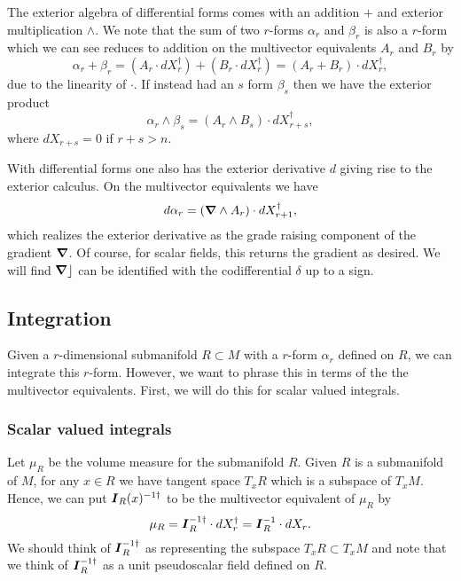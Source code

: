 The exterior algebra of differential forms comes with an addition $+$ and exterior multiplication $\wedge$.  We note that the sum of two $r$-forms $\alpha_r$ and $\beta_r$ is also a $r$-form which we can see reduces to addition on the multivector equivalents $A_r$ and $B_r$ by
\begin{equation}
\alpha_r + \beta_r = (A_r \cdot dX_r^\dagger)+(B_r \cdot dX_r^\dagger) = (A_r + B_r) \cdot dX_r^\dagger,
\end{equation}
due to the linearity of $\cdot$.  If instead had an $s$ form $\beta_s$ then we have the exterior product
\begin{equation}
\alpha_r \wedge \beta_s = (A_r \wedge B_s) \cdot dX_{r+s}^\dagger,
\end{equation}
where $dX_{r+s}=0$ if $r+s>n$.  

With differential forms one also has the exterior derivative $d$ giving rise to the exterior calculus. On the multivector equivalents we have
\begin{equation}
d \alpha_r = (\boldsymbol{\nabla} \wedge A_r) \cdot dX_{r+1}^\dagger,
\end{equation}
which realizes the exterior derivative as the grade raising component of the gradient $\boldsymbol{\nabla}$. Of course, for scalar fields, this returns the gradient as desired. We will find $\boldsymbol{\nabla} \rfloor$ can be identified with the codifferential $\delta$ up to a sign. 

\subsection{Integration}
\label{subsec:integration_on_submanifolds}

Given a $r$-dimensional submanifold $R \subset M$ with a $r$-form $\alpha_r$ defined on $R$, we can integrate this $r$-form. However, we want to phrase this in terms of the the multivector equivalents.  First, we will do this for scalar valued integrals. 

\subsubsection{Scalar valued integrals}
Let $\mu_R$ be the volume measure for the submanifold $R$.  Given $R$ is a submanifold of $M$, for any $x \in R$ we have tangent space $T_x R$ which is a subspace of $T_x M$. Hence, we can put $\boldsymbol{I}_R(x)^{-1 \dagger}$ to be the multivector equivalent of $\mu_R$ by
\begin{equation}
\label{eq:submanifold_volume_form}
\mu_R = \boldsymbol{I}_R^{-1 \dagger} \cdot dX_r^\dagger = \boldsymbol{I}_R^{-1} \cdot dX_r.
\end{equation}
We should think of $\boldsymbol{I}_R^{-1 \dagger}$ as representing the subspace $T_x R \subset T_x M$ and note that we think of $\boldsymbol{I}_R^{-1 \dagger}$ as a unit pseudoscalar field defined on $R$. 

